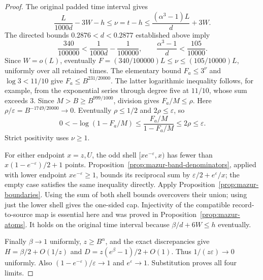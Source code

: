 \documentclass[11pt]{article}
\theoremstyle{remark}\newtheorem{remark}[proposition]{Remark}
\begin{document}
\begin{proof}
The original padded time interval gives
\[
 \frac{L}{1000d}-3W-h\le \nu=t-h
 \le\frac{(\alpha^3-1)L}{d}+3W .
\]
The directed bounds $0.2876<d<0.2877$ established above imply
\[
 \frac{340}{100000}<\frac1{1000d}-\frac1{100000},
 \qquad \frac{\alpha^3-1}{d}<\frac{105}{10000}.
\]
Since $W=o(L)$, eventually
$F=(340/100000)L\le\nu\le(105/10000)L$,
uniformly over all retained times. The elementary bound $F_a\le3^\nu$
and $\log3<11/10$ give $F_a\le B^{231/20000}$.
The latter logarithmic inequality follows, for example, from the
exponential series through degree five at $11/10$, whose sum exceeds $3$.
Since $M>B\ge B^{999/1000}$, division gives $F_a/M\le\rho$.
Here $\rho/\varepsilon=B^{-1749/20000}\to0$. Eventually $\rho\le1/2$
and $2\rho\le\varepsilon$, so
\[
 0<-\log(1-F_a/M)\le\frac{F_a/M}{1-F_a/M}\le2\rho\le\varepsilon.
\]
Strict positivity uses $\nu\ge1$.

For either endpoint $x=z,U$, the odd shell $[xe^{-\varepsilon},x)$
has fewer than $x(1-e^{-\varepsilon})/2+1$ points.
Proposition~\ref{prop:mazur-band-denominators}, applied with lower endpoint
$xe^{-\varepsilon}\ge1$, bounds its reciprocal sum by
$\varepsilon/2+e^\varepsilon/x$; the empty case satisfies the same
inequality directly. Apply Proposition~\ref{prop:mazur-boundaries}.
Using the sum of both shell bounds overcovers their union; using just the
lower shell gives the one-sided cap. Injectivity of the compatible
record-to-source map is essential here and was proved in
Proposition~\ref{prop:mazur-atoms}. It holds on the original time interval
because $\beta/d+6W\le h$ eventually.

Finally $\beta\to1$ uniformly, $z\ge B^\alpha$, and the exact discrepancies
give $H=\beta/2+O(1/z)$ and
$D=z(e^\beta-1)/2+O(1)$. Thus $1/(z\varepsilon)\to0$ uniformly.
Also $(1-e^{-\varepsilon})/\varepsilon\to1$ and
$e^\varepsilon\to1$. Substitution proves all four limits.
\end{proof}
\end{document}
